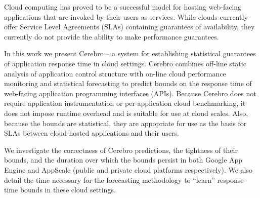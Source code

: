 Cloud computing has proved to be a successful model for hosting web-facing
applications that are invoked by their users as services.  While clouds
currently offer Service Level Agreements (SLAs) containing guarantees of
availability, they currently do not provide the ability to make performance
guarantees.

In this work we present Cerebro -- a system for establishing statistical
guarantees of application response time in cloud settings.  Cerebro combines
off-line static analysis of application control structure with on-line cloud
performance monitoring and statistical forecasting to predict bounds on the
response time of web-facing application programming interfaces (APIs).
Because Cerebro does not require application instrumentation or 
per-application cloud benchmarking, it does not impose runtime overhead
and is suitable for use at cloud scales.  Also, because the bounds are
statistical, they are appopriate for use as the basis for SLAs between
cloud-hosted applications and their users.

We investigate the correctness of Cerebro predictions, the tightness of their
bounds, and the duration over which the bounds persist in both Google App
Engine and AppScale (public and private cloud platforms respectively).  
We also detail the time necessary for the forecasting 
methodology to ``learn'' response-time bounds in these cloud settings. 


